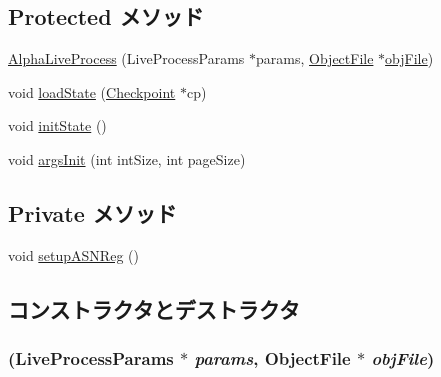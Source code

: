 \subsection*{Protected メソッド}
\begin{DoxyCompactItemize}
\item 
\hyperlink{classAlphaLiveProcess_a01ab49d1a6d4c484cd4818c2ec4c7a1c}{AlphaLiveProcess} (LiveProcessParams $\ast$params, \hyperlink{classObjectFile}{ObjectFile} $\ast$\hyperlink{classLiveProcess_ab6cfcfa7903c66267b3e0351c3caa809}{objFile})
\item 
void \hyperlink{classAlphaLiveProcess_a0c3e6eb311ceff72035b11f2a5e0f186}{loadState} (\hyperlink{classCheckpoint}{Checkpoint} $\ast$cp)
\item 
void \hyperlink{classAlphaLiveProcess_a3c34ea9b29f410748d4435a667484924}{initState} ()
\item 
void \hyperlink{classAlphaLiveProcess_a60e5314ffeede1e51c6bcb2cf606ca92}{argsInit} (int intSize, int pageSize)
\end{DoxyCompactItemize}
\subsection*{Private メソッド}
\begin{DoxyCompactItemize}
\item 
void \hyperlink{classAlphaLiveProcess_a53a76c20b309afae10d511cf9fa8beb0}{setupASNReg} ()
\end{DoxyCompactItemize}


\subsection{コンストラクタとデストラクタ}
\hypertarget{classAlphaLiveProcess_a01ab49d1a6d4c484cd4818c2ec4c7a1c}{
\subsubsection[{AlphaLiveProcess}]{ (LiveProcessParams $\ast$ {\em params}, \/  {\bf ObjectFile} $\ast$ {\em objFile})}}
\label{classAlphaLiveProcess_a01ab49d1a6d4c484cd4818c2ec4c7a1c}



